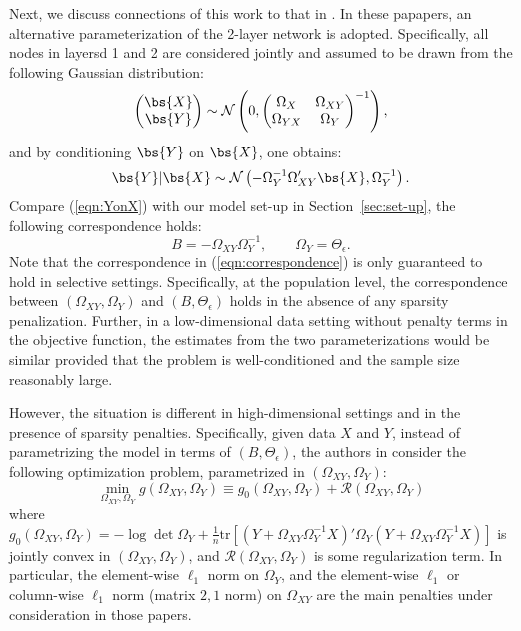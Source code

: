 Next, we discuss connections of this work to that in \citet{sohn2012joint,yuan2014partial,mccarter2014sparse}. In these papapers,
an alternative parameterization of the 2-layer network is adopted. Specifically, all nodes in layersd 1 and 2 are considered
jointly and assumed to be drawn from the following Gaussian distribution:
\begin{equation*}
\begin{pmatrix}
\bs{X} \\ \bs{Y}
\end{pmatrix}\sim \mathcal{N}\left( 0, \begin{pmatrix}
\Omega_{X} & \Omega_{XY} \\ \Omega_{YX} & \Omega_{Y}
\end{pmatrix}^{-1} \right), 
\end{equation*}
and by conditioning $\bs{Y}$ on $\bs{X}$, one obtains:
\begin{equation}\label{eqn:YonX}
\bs{Y}|\bs{X} \sim \mathcal{N}\left(-\Omega_Y^{-1} \Omega'_{XY} \bs{X},  \Omega_Y^{-1}\right).
\end{equation}
Compare (\ref{eqn:YonX}) with our model set-up in Section~\ref{sec:set-up}, the following correspondence holds:
\begin{equation}\label{eqn:correspondence}
B = - \Omega_{XY}\Omega_{Y}^{-1}, \qquad \Omega_Y = \Theta_\epsilon. 
\end{equation}
Note that the correspondence in (\ref{eqn:correspondence}) is only guaranteed to hold in selective settings.
Specifically, at the population level, the correspondence between $(\Omega_{XY},\Omega_Y)$ and $(B,\Theta_\epsilon)$ holds
in the absence of any sparsity penalization. Further, in a low-dimensional data setting without penalty terms in the 
objective function, the estimates from the two
parameterizations would be similar provided that the problem is well-conditioned and the sample size reasonably large.

However, the situation is different in high-dimensional settings and in the presence of sparsity penalties. Specifically,
given data $X$ and $Y$, instead of parametrizing the model in terms of $(B,\Theta_\epsilon)$, the authors in \cite{sohn2012joint,yuan2014partial,mccarter2014sparse} consider the following optimization problem, parametrized in $(\Omega_{XY},\Omega_Y)$:
\begin{equation}\label{opt:convex}
\min\limits_{\Omega_{XY},\Omega_Y} g(\Omega_{XY},\Omega_Y) \equiv  g_0(\Omega_{XY},\Omega_Y)
+ \mathcal{R}(\Omega_{XY},\Omega_{Y})
\end{equation}
where $g_0(\Omega_{XY},\Omega_Y) = -\log\det\Omega_Y + \frac{1}{n}\text{tr}\left[ (Y + \Omega_{XY}\Omega_{Y}^{-1} X)'\Omega_Y (Y + \Omega_{XY}\Omega_{Y}^{-1}X) \right]$ is jointly convex in $(\Omega_{XY},\Omega_Y)$, and $\mathcal{R}(\Omega_{XY},\Omega_Y)$ is some regularization term. In particular, the element-wise $\ell_1$ norm on $\Omega_Y$, and the element-wise $\ell_1$ or column-wise $\ell_1$ norm (matrix $2,1$ norm) on $\Omega_{XY}$ are the main penalties under consideration in those papers. 

